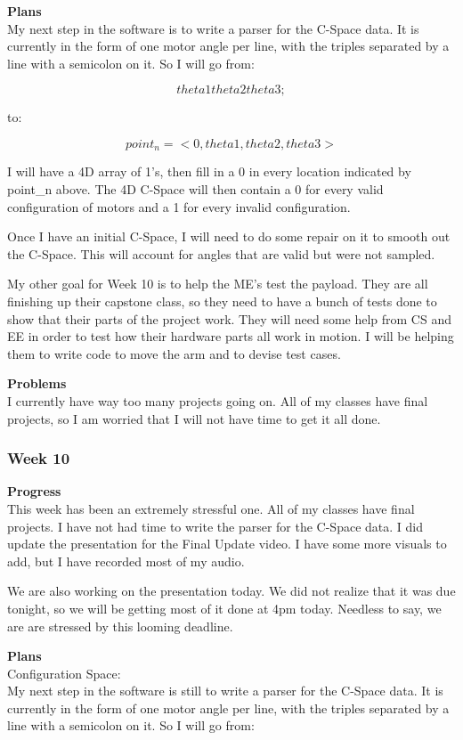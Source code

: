 \textbf{Plans} \\ 
My next step in the software is to write a parser for the C-Space data. It is currently in the form of one motor angle per line, with the triples separated by a line with a semicolon on it. So I will go from:

\[ theta1 theta2 theta3 ;\]

to:

\[ point_n = <0, theta1, theta2, theta3> \]

I will have a 4D array of 1's, then fill in a 0 in every location indicated by point\_n above. The 4D C-Space will then contain a 0 for every valid configuration of motors and a 1 for every invalid configuration.

Once I have an initial C-Space, I will need to do some repair on it to smooth out the C-Space. This will account for angles that are valid but were not sampled.

My other goal for Week 10 is to help the ME's test the payload. They are all finishing up their capstone class, so they need to have a bunch of tests done to show that their parts of the project work. They will need some help from CS and EE in order to test how their hardware parts all work in motion. I will be helping them to write code to move the arm and to devise test cases.


\textbf{Problems} \\ 
I currently have way too many projects going on. All of my classes have final projects, so I am worried that I will not have time to get it all done.

\subsubsection{Week 10}
\textbf{Progress} \\ 
This week has been an extremely stressful one. All of my classes have final projects. I have not had time to write the parser for the C-Space data. I did update the presentation for the Final Update video. I have some more visuals to add, but I have recorded most of my audio.

We are also working on the presentation today. We did not realize that it was due tonight, so we will be getting most of it done at 4pm today. Needless to say, we are are stressed by this looming deadline.

\textbf{Plans} \\ 
Configuration Space: \\ 
My next step in the software is still to write a parser for the C-Space data. It is currently in the form of one motor angle per line, with the triples separated by a line with a semicolon on it. So I will go from:

